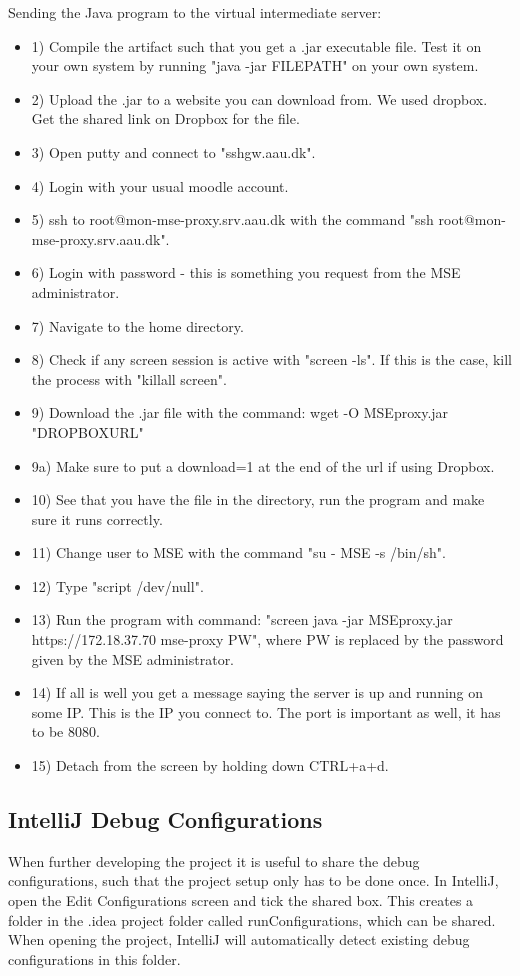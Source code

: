 Sending the Java program to the virtual intermediate server:
\begin{itemize}
\item 1) Compile the artifact such that you get a .jar executable file. Test it on your own system by running "java -jar FILEPATH" on your own system.
\item 2) Upload the .jar to a website you can download from. We used dropbox. Get the shared link on Dropbox for the file.
\item 3) Open putty and connect to "sshgw.aau.dk".
\item 4) Login with your usual moodle account.
\item 5) ssh to root@mon-mse-proxy.srv.aau.dk with the command "ssh root@mon-mse-proxy.srv.aau.dk".
\item 6) Login with password - this is something you request from the MSE administrator.
\item 7) Navigate to the home directory.
\item 8) Check if any screen session is active with "screen -ls". If this is the case, kill the process with "killall screen".
\item 9) Download the .jar file with the command: wget -O MSEproxy.jar "DROPBOXURL" 
\item 9a) Make sure to put a download=1 at the end of the url if using Dropbox.
\item 10) See that you have the file in the directory, run the program and make sure it runs correctly.
\item 11) Change user to MSE with the command "su - MSE -s /bin/sh".
\item 12) Type "script /dev/null".
\item 13) Run the program with command: "screen java -jar MSEproxy.jar https://172.18.37.70 mse-proxy PW", where PW is replaced by the password given by the MSE administrator.
\item 14) If all is well you get a message saying the server is up and running on some IP. This is the IP you connect to. The port is important as well, it has to be 8080.
\item 15) Detach from the screen by holding down CTRL+a+d.
\end{itemize}

\subsection*{IntelliJ Debug Configurations}
When further developing the project it is useful to share the debug configurations, such that the project setup only has to be done once. In IntelliJ, open the Edit Configurations screen and tick the shared box. This creates a folder in the .idea project folder called runConfigurations, which can be shared. When opening the project, IntelliJ will automatically detect existing debug configurations in this folder.

